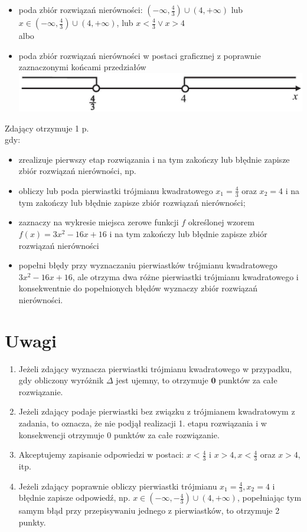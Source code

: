 \documentclass[10pt]{article}
\begin{document}
\begin{itemize}
  \item poda zbiór rozwiązań nierówności: $\left(-\infty, \frac{4}{3}\right) \cup(4,+\infty)$ lub $x \in\left(-\infty, \frac{4}{3}\right) \cup(4,+\infty)$, lub $x<\frac{4}{3} \vee x>4$\\
albo
  \item poda zbiór rozwiązań nierówności w postaci graficznej z poprawnie zaznaczonymi końcami przedziałów\\
\includegraphics[max width=\textwidth, center]{2025_02_07_cbaae63d39acb23a5920g-08}
\end{itemize}

Zdający otrzymuje 1 p.\\
gdy:

\begin{itemize}
  \item zrealizuje pierwszy etap rozwiązania i na tym zakończy lub błędnie zapisze zbiór rozwiązań nierówności, np.
  \item obliczy lub poda pierwiastki trójmianu kwadratowego $x_{1}=\frac{4}{3}$ oraz $x_{2}=4$ i na tym zakończy lub błędnie zapisze zbiór rozwiązań nierówności;
  \item zaznaczy na wykresie miejsca zerowe funkcji $f$ określonej wzorem $f(x)=3 x^{2}-16 x+16$ i na tym zakończy lub błędnie zapisze zbiór rozwiązań nierówności
  \item popełni błędy przy wyznaczaniu pierwiastków trójmianu kwadratowego $3 x^{2}-16 x+16$, ale otrzyma dwa różne pierwiastki trójmianu kwadratowego i konsekwentnie do popełnionych błędów wyznaczy zbiór rozwiązań nierówności.
\end{itemize}

\section*{Uwagi}
\begin{enumerate}
  \item Jeżeli zdający wyznacza pierwiastki trójmianu kwadratowego w przypadku, gdy obliczony wyróżnik $\Delta$ jest ujemny, to otrzymuje $\mathbf{0}$ punktów za całe rozwiązanie.
  \item Jeżeli zdający podaje pierwiastki bez związku z trójmianem kwadratowym z zadania, to oznacza, że nie podjął realizacji 1. etapu rozwiązania i w konsekwencji otrzymuje 0 punktów za całe rozwiązanie.
  \item Akceptujemy zapisanie odpowiedzi w postaci: $x<\frac{4}{3}$ i $x>4, x<\frac{4}{3}$ oraz $x>4$, itp.
  \item Jeżeli zdający poprawnie obliczy pierwiastki trójmianu $x_{1}=\frac{4}{3}, x_{2}=4$ i błędnie zapisze odpowiedź, np. $x \in\left(-\infty,-\frac{4}{3}\right) \cup(4,+\infty)$, popełniając tym samym błąd przy przepisywaniu jednego z pierwiastków, to otrzymuje 2 punkty.
\end{enumerate}
\end{document}
